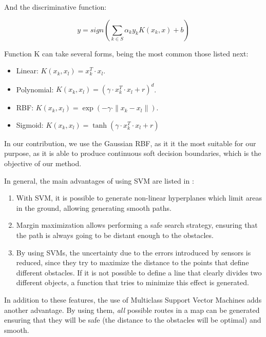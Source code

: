 And the discriminative function:

\begin{equation}\label{eq:appendixSVM_soft_discriminative_function}
 y = sign \left( \sum_{k \in S} \alpha_k y_k K(x_k, x) + b \right)
\end{equation}

Function K can take several forms, being the most common those listed next:
\begin{itemize}
 \item Linear: $K(x_k, x_l) = x_k^T \cdot x_l$.
 \item Polynomial: $K(x_k, x_l) = (\gamma \cdot x_k^T \cdot x_l + r)^d$.
 \item \acf{RBF}: $K(x_k, x_l) = \exp(-\gamma \cdot \| x_k - x_l\|)$.
 \item Sigmoid: $K(x_k, x_l) = \tanh(\gamma \cdot x_k^T \cdot x_l + r)$
\end{itemize}

In our contribution, we use the Gaussian \acf{RBF}, as it it the most suitable for our purpose, as it is able to produce continuous soft decision boundaries, which is the objective of our method.

In general, the main advantages of using \ac{SVM}  are listed in \cite{miura2006support}:

\begin{enumerate}
\item With \ac{SVM}, it is possible to generate non-linear hyperplanes which limit areas in the ground, allowing generating smooth paths.
\item Margin maximization allows performing a safe search strategy, ensuring that the path is always going to be distant enough to the obstacles.
\item By using \acp{SVM}, the uncertainty due to the errors introduced by sensors is reduced, since they try to maximize the distance to the points that define different obstacles. If it is not possible to define a line that clearly divides two different objects, a function that tries to minimize this effect is generated.
\end{enumerate}

In addition to these features, the use of Multiclass Support Vector Machines adds another advantage.  By using them, \emph{all} possible routes in a map can be generated ensuring that they will be safe (the distance to the obstacles will be optimal) and smooth.